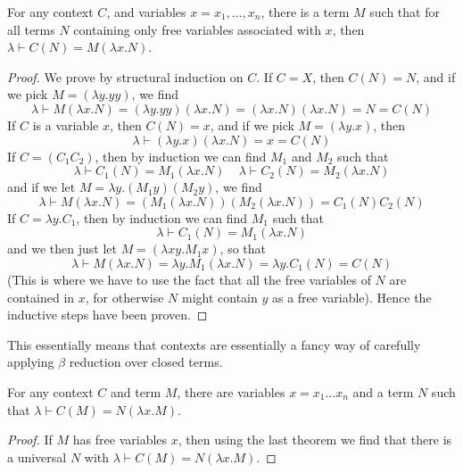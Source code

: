 \begin{lemma}
    For any context $C$, and variables $x = x_1, \dots, x_n$, there is a term $M$ such that for all terms $N$ containing only free variables associated with $x$, then $\lambda \vdash C(N) = M(\lambda x.N)$.
\end{lemma}
\begin{proof}
    We prove by structural induction on $C$. If $C = X$, then $C(N) = N$, and if we pick $M = (\lambda y.yy)$, we find
    \[ \lambda \vdash M(\lambda x.N) = (\lambda y.yy)(\lambda x.N) = (\lambda x.N)(\lambda x.N) = N = C(N) \]
    If $C$ is a variable $x$, then $C(N) = x$, and if we pick $M = (\lambda y.x)$, then
    \[ \lambda \vdash (\lambda y.x)(\lambda x.N) = x = C(N) \]
    If $C = (C_1 C_2)$, then by induction we can find $M_1$ and $M_2$ such that
    \[ \lambda \vdash C_1(N) = M_1(\lambda x.N)\ \ \ \ \ \lambda \vdash C_2(N) = M_2(\lambda x.N) \]
    and if we let $M = \lambda y.(M_1 y)(M_2 y)$, we find
    \[ \lambda \vdash M(\lambda x.N) = (M_1 (\lambda x.N))(M_2 (\lambda x.N)) = C_1(N) C_2(N) \]
    If $C = \lambda y.C_1$, then by induction we can find $M_1$ such that
    \[ \lambda \vdash C_1(N) = M_1(\lambda x.N) \]
    and we then just let $M = (\lambda xy. M_1 x)$, so that
    \[ \lambda \vdash M(\lambda x.N) = \lambda y.M_1(\lambda x.N) = \lambda y.C_1(N) = C(N) \]
    (This is where we have to use the fact that all the free variables of $N$ are contained in $x$, for otherwise $N$ might contain $y$ as a free variable). Hence the inductive steps have been proven.
\end{proof}

This essentially means that contexts are essentially a fancy way of carefully applying $\beta$ reduction over closed terms.

\begin{corollary}
    For any context $C$ and term $M$, there are variables $x = x_1 \dots x_n$ and a term $N$ such that $\lambda \vdash C(M) = N(\lambda x.M)$.
\end{corollary}
\begin{proof}
    If $M$ has free variables $x$, then using the last theorem we find that there is a universal $N$ with $\lambda \vdash C(M) = N(\lambda x.M)$.
\end{proof}

